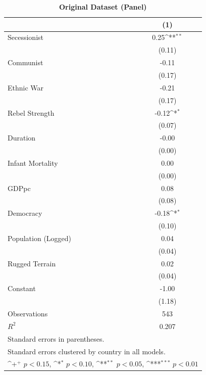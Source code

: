 \documentclass[12pt, letterpaper]{article}
\begin{document}
\newpage
\begin{table}[htbp]\centering
\begin{small}
\def\sym#1{\ifmmode^{#1}\else\(^{#1}\)\fi}
\renewcommand\thetable{A.\Roman{table}}
\makeatletter
\def\myrow{}
\CT@everycr{\noalign{%
\global\let\CT@row@color\relax
\stepcounter{mym19}%
\ifnum\value{mym19}=2
  \gdef\myrow{\rowcolor{gray!50}}
\else\ifnum\value{mym19}=4
  \gdef\myrow{}
\fi\fi
}\myrow}
\caption{\textbf{Original Dataset (Panel)}}
\begin{tabular}{l*{1}{c}}
\hline\hline
                    &\multicolumn{1}{c}{(1)}\\
\hline
Secessionist      &        0.25\sym{**} \\
                    &      (0.11)         \\
Communist           &       -0.11         \\
                    &      (0.17)         \\
Ethnic War          &       -0.21         \\
                    &      (0.17)         \\
Rebel Strength      &       -0.12\sym{*}  \\
                    &      (0.07)         \\
Duration            &       -0.00         \\
                    &      (0.00)         \\
Infant Mortality    &        0.00         \\
                    &      (0.00)         \\
GDPpc               &        0.08         \\
                    &      (0.08)         \\
Democracy           &       -0.18\sym{*}  \\
                    &      (0.10)         \\
Population (Logged) &        0.04         \\
                    &      (0.04)         \\
Rugged Terrain      &        0.02         \\
                    &      (0.04)         \\
Constant            &       -1.00         \\
                    &      (1.18)         \\
\hline
Observations        &         543         \\
\(R^{2}\)           &       0.207         \\
\hline\hline
\multicolumn{2}{l}{\footnotesize Standard errors in parentheses.}\\
\multicolumn{2}{l}{\footnotesize Standard errors clustered by country in all models.}\\
\multicolumn{2}{l}{\footnotesize \sym{+} \(p<0.15\), \sym{*} \(p<0.10\), \sym{**} \(p<0.05\), \sym{***} \(p<0.01\)}\\
\end{tabular}
\end{small}
\end{table}
\end{document}
